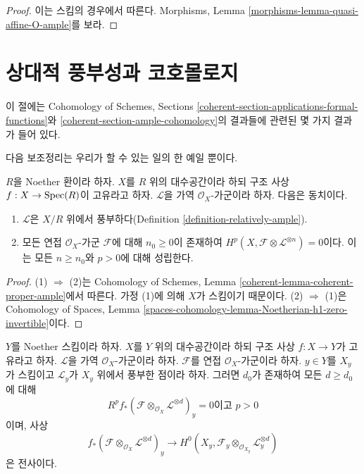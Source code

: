 \begin{proof}
이는 스킴의 경우에서 따른다. Morphisms, Lemma
\ref{morphisms-lemma-quasi-affine-O-ample}를 보라.
\end{proof}

\section{상대적 풍부성과 코호몰로지}
\label{section-ample-and-proper}

\noindent
이 절에는 Cohomology of Schemes, Sections
\ref{coherent-section-applications-formal-functions}와
\ref{coherent-section-ample-cohomology}의 결과들에 관련된 몇 가지 결과가
들어 있다.

\medskip\noindent
다음 보조정리는 우리가 할 수 있는 일의 한 예일 뿐이다.

\begin{lemma}
\label{lemma-vanshing-gives-ample}
$R$을 Noether 환이라 하자. $X$를 $R$ 위의 대수공간이라 하되 구조 사상
$f : X \to \mathop{\mathrm{Spec}}(R)$이 고유라고 하자.
$\mathcal{L}$을 가역 $\mathcal{O}_X$-가군이라 하자. 다음은 동치이다.
\begin{enumerate}
\item $\mathcal{L}$은 $X/R$ 위에서 풍부하다(Definition
\ref{definition-relatively-ample}).
\item 모든 연접 $\mathcal{O}_X$-가군 $\mathcal{F}$에 대해
$n_0 \geq 0$이 존재하여
$H^p(X, \mathcal{F} \otimes \mathcal{L}^{\otimes n}) = 0$이다.
이는 모든 $n \geq n_0$와 $p > 0$에 대해 성립한다.
\end{enumerate}
\end{lemma}

\begin{proof}
(1) $\Rightarrow$ (2)는 Cohomology of Schemes, Lemma
\ref{coherent-lemma-coherent-proper-ample}에서 따른다. 가정 (1)에 의해
$X$가 스킴이기 때문이다. (2) $\Rightarrow$ (1)은 Cohomology of Spaces,
Lemma \ref{spaces-cohomology-lemma-Noetherian-h1-zero-invertible}이다.
\end{proof}

\begin{lemma}
\label{lemma-ample-on-fibre}
$Y$를 Noether 스킴이라 하자. $X$를 $Y$ 위의 대수공간이라 하되 구조
사상 $f : X \to Y$가 고유라고 하자.
$\mathcal{L}$을 가역 $\mathcal{O}_X$-가군이라 하자.
$\mathcal{F}$를 연접 $\mathcal{O}_X$-가군이라 하자.
$y \in Y$를 $X_y$가 스킴이고 $\mathcal{L}_y$가 $X_y$ 위에서 풍부한
점이라 하자. 그러면 $d_0$가 존재하여 모든 $d \geq d_0$에 대해
$$
R^pf_*(\mathcal{F} \otimes_{\mathcal{O}_X} \mathcal{L}^{\otimes d})_y = 0
\text{이고 }p > 0
$$
이며, 사상
$$
f_*(\mathcal{F} \otimes_{\mathcal{O}_X} \mathcal{L}^{\otimes d})_y
\longrightarrow
H^0(X_y, \mathcal{F}_y \otimes_{\mathcal{O}_{X_y}} \mathcal{L}_y^{\otimes d})
$$
은 전사이다.
\end{lemma}

